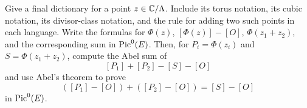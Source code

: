 \begin{exercise}
Give a final dictionary for a point \(z\in\mathbb{C}/\Lambda\).  Include its torus
notation, its cubic notation, its divisor-class notation, and the rule for
adding two such points in each language.  Write the formulas for
\(\Phi(z)\), \([\Phi(z)]-[O]\), \(\Phi(z_1+z_2)\), and the corresponding sum in
\(\operatorname{Pic}^0(E)\).  Then, for \(P_i=\Phi(z_i)\) and \(S=\Phi(z_1+z_2)\), compute
the Abel sum of
\[
  [P_1]+[P_2]-[S]-[O]
\]
and use Abel's theorem to prove
\[
  ([P_1]-[O])+([P_2]-[O])=[S]-[O]
\]
in \(\operatorname{Pic}^0(E)\).
\end{exercise}
